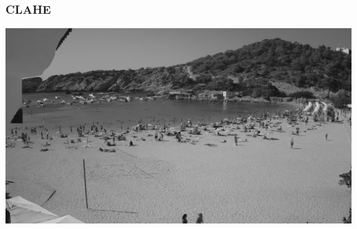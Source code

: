 \documentclass{beamer}
\begin{document}

\begin{frame}
    \frametitle{CLAHE}
    \centering
    \includegraphics[width=\textwidth]{../gen/gray/1660316400.jpg}
  
\end{frame}
\end{document}
